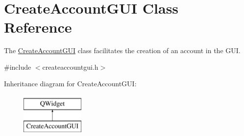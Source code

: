 \hypertarget{classCreateAccountGUI}{}\section{Create\+Account\+G\+UI Class Reference}
\label{classCreateAccountGUI}


The \hyperlink{classCreateAccountGUI}{Create\+Account\+G\+UI} class facilitates the creation of an account in the G\+UI.  




{\ttfamily \#include $<$createaccountgui.\+h$>$}

Inheritance diagram for Create\+Account\+G\+UI\+:\begin{figure}[H]
\begin{center}
\leavevmode
\includegraphics[height=2.000000cm]{classCreateAccountGUI}
\end{center}
\end{figure}
